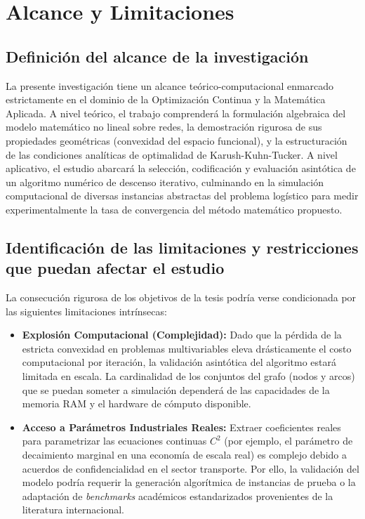 \section{Alcance y Limitaciones}

\subsection{Definición del alcance de la investigación}
La presente investigación tiene un alcance teórico-computacional enmarcado estrictamente en el dominio de la Optimización Continua y la Matemática Aplicada. A nivel teórico, el trabajo comprenderá la formulación algebraica del modelo matemático no lineal sobre redes, la demostración rigurosa de sus propiedades geométricas (convexidad del espacio funcional), y la estructuración de las condiciones analíticas de optimalidad de Karush-Kuhn-Tucker. A nivel aplicativo, el estudio abarcará la selección, codificación y evaluación asintótica de un algoritmo numérico de descenso iterativo, culminando en la simulación computacional de diversas instancias abstractas del problema logístico para medir experimentalmente la tasa de convergencia del método matemático propuesto.

\subsection{Identificación de las limitaciones y restricciones que puedan afectar el estudio}
La consecución rigurosa de los objetivos de la tesis podría verse condicionada por las siguientes limitaciones intrínsecas:
\begin{itemize}
    \item \textbf{Explosión Computacional (Complejidad):} Dado que la pérdida de la estricta convexidad en problemas multivariables eleva drásticamente el costo computacional por iteración, la validación asintótica del algoritmo estará limitada en escala. La cardinalidad de los conjuntos del grafo (nodos y arcos) que se puedan someter a simulación dependerá de las capacidades de la memoria RAM y el hardware de cómputo disponible.
    \item \textbf{Acceso a Parámetros Industriales Reales:} Extraer coeficientes reales para parametrizar las ecuaciones continuas $C^2$ (por ejemplo, el parámetro de decaimiento marginal en una economía de escala real) es complejo debido a acuerdos de confidencialidad en el sector transporte. Por ello, la validación del modelo podría requerir la generación algorítmica de instancias de prueba o la adaptación de \textit{benchmarks} académicos estandarizados provenientes de la literatura internacional.
\end{itemize}

